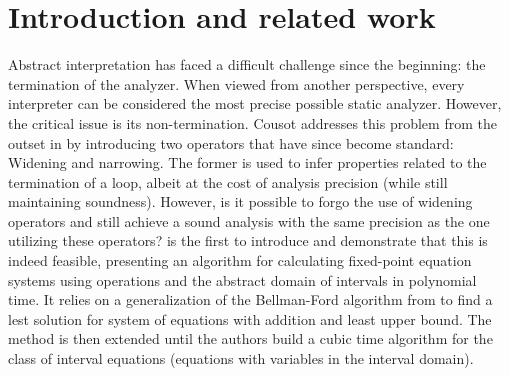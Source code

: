 \section{Introduction and related work}
\label{sec:prev}

Abstract interpretation has faced a difficult challenge since the
beginning: the termination of the analyzer. When viewed from another
perspective, every interpreter can be considered the most precise
possible static analyzer. However, the critical issue is its
non-termination. Cousot addresses this problem from the outset in
\cite{patrickradiha:one} by introducing two operators that have since
become standard: Widening and narrowing. The former is used to infer
properties related to the termination of a loop, albeit at the cost of
analysis precision (while still maintaining soundness). However, is it
possible to forgo the use of widening operators and still achieve a
sound analysis with the same precision as the one utilizing these
operators? \cite{Gawlitza2009} is the first to introduce and
demonstrate that this is indeed feasible, presenting an algorithm for
calculating fixed-point equation systems using operations and the
abstract domain of intervals in polynomial time.  It relies on a
generalization of the Bellman-Ford algorithm from
\cite{bellman1958algo} to find a lest solution for system of equations
with addition and least upper bound. The method is then extended until
the authors build a cubic time algorithm for the class of interval
equations (equations with variables in the interval domain).

